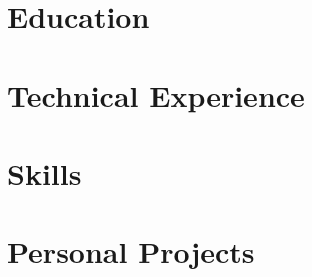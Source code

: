 \documentclass[letter,11pt]{article}
\begin{document}
	
	\section{Education}
	
	
	
	\section{Technical Experience}
	
	
	\section{Skills}
	
	
	\section{Personal Projects}
	
	
	
\end{document}
